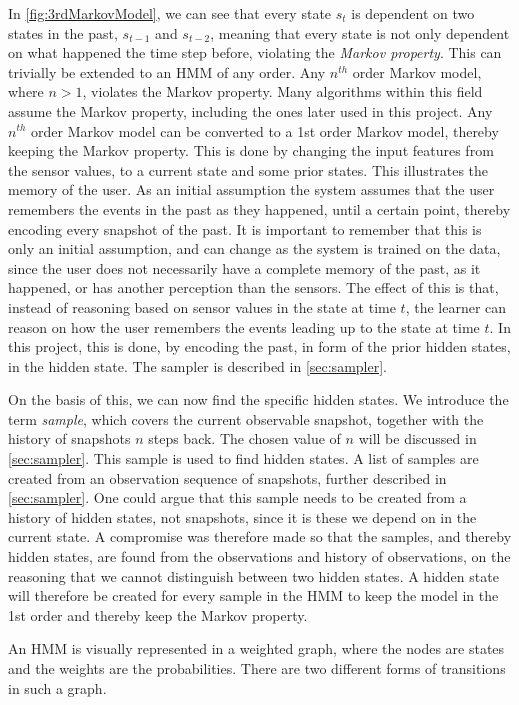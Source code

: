 In \cref{fig:3rdMarkovModel}, we can see that every state $s_t$ is dependent on two states in the past, $s_{t-1}$ and $s_{t-2}$, meaning that every state is not only dependent on what happened the time step before, violating the \emph{Markov property}. This can trivially be extended to an HMM of any order. Any $n^{th}$ order Markov model, where $n>1$, violates the Markov property. Many algorithms within this field assume the Markov property, including the ones later used in this project. Any $n^{th}$ order Markov model can be converted to a 1st order Markov model, thereby keeping the Markov property. This is done by changing the input features from the sensor values, to a current state and some prior states. This illustrates the memory of the user. As an initial assumption the system assumes that the user remembers the events in the past as they happened, until a certain point, thereby encoding every snapshot of the past. It is important to remember that this is only an initial assumption, and can change as the system is trained on the data, since the user does not necessarily have a complete memory of the past, as it happened, or has another perception than the sensors. The effect of this is that, instead of reasoning based on sensor values in the state at time $t$, the learner can reason on how the user remembers the events leading up to the state at time $t$. In this project, this is done, by encoding the past, in form of the prior hidden states, in the hidden state. The sampler is described in \cref{sec:sampler}.

On the basis of this, we can now find the specific hidden states. We introduce the term \emph{sample}, which covers the current observable snapshot, together with the history of snapshots $n$ steps back. The chosen value of $n$ will be discussed in \cref{sec:sampler}. This sample is used to find hidden states. A list of samples are created from an observation sequence of snapshots, further described in \cref{sec:sampler}. One could argue that this sample needs to be created from a history of hidden states, not snapshots, since it is these we depend on in the current state. A compromise was therefore made so that the samples, and thereby hidden states, are found from the observations and history of observations, on the reasoning that we cannot distinguish between two hidden states. A hidden state will therefore be created for every sample in the HMM to keep the model in the 1st order and thereby keep the Markov property.

An HMM is visually represented in a weighted graph, where the nodes are states and the weights are the probabilities. There are two different forms of transitions in such a graph.

